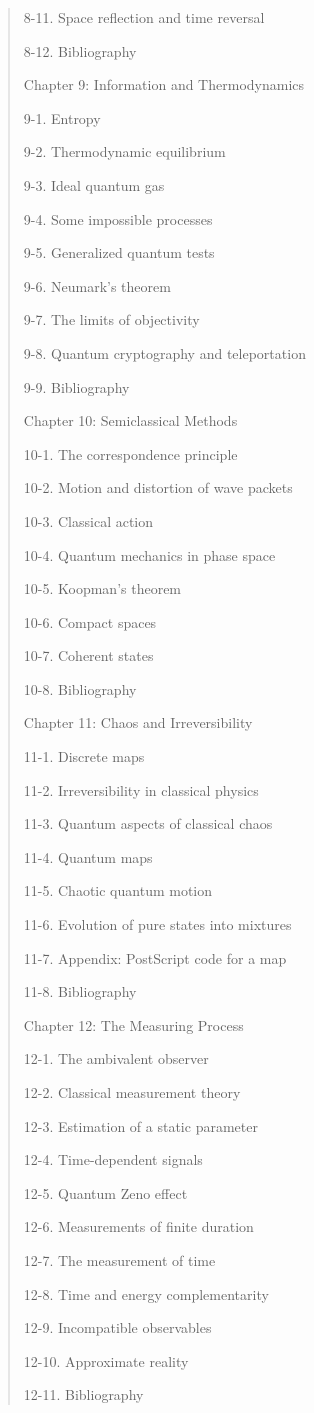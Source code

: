 \documentclass[12pt]{article}
\begin{document}
\begin{quote}
{8-11. Space reflection and time reversal 

8-12. Bibliography 

Chapter 9: Information and Thermodynamics

9-1. Entropy 

9-2. Thermodynamic equilibrium 

9-3. Ideal quantum gas 

9-4. Some impossible processes 

9-5. Generalized quantum tests 

9-6. Neumark's theorem 

9-7. The limits of objectivity 

9-8. Quantum cryptography and teleportation 

9-9. Bibliography 

Chapter 10: Semiclassical Methods

10-1. The correspondence principle 

10-2. Motion and distortion of wave packets 

10-3. Classical action 

10-4. Quantum mechanics in phase space 

10-5. Koopman's theorem 

10-6. Compact spaces 

10-7. Coherent states 

10-8. Bibliography 

Chapter 11: Chaos and Irreversibility

11-1. Discrete maps 

11-2. Irreversibility in classical physics 

11-3. Quantum aspects of classical chaos 

11-4. Quantum maps 

11-5. Chaotic quantum motion 

11-6. Evolution of pure states into mixtures 

11-7. Appendix: PostScript code for a map 

11-8. Bibliography 

Chapter 12: The Measuring Process

12-1. The ambivalent observer 

12-2. Classical measurement theory 

12-3. Estimation of a static parameter 

12-4. Time-dependent signals 

12-5. Quantum Zeno effect 

12-6. Measurements of finite duration 

12-7. The measurement of time 

12-8. Time and energy complementarity 

12-9. Incompatible observables 

12-10. Approximate reality 

12-11. Bibliography
}
\end{quote}
\end{document}
